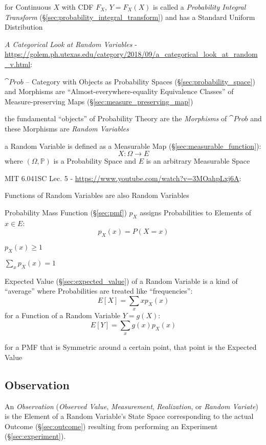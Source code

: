 for Continuous $X$ with CDF $F_X$, $Y = F_X(X)$ is called a \emph{Probability
  Integral Transform} (\S\ref{sec:probability_integral_transform}) and has a
Standard Uniform Distribution

\asterism

\emph{A Categorical Look at Random Variables} -
\url{https://golem.ph.utexas.edu/category/2018/09/a_categorical_look_at_random_v.html}:

$\cat{Prob}$ -- Category with Objects as Probability Spaces
(\S\ref{sec:probability_space}) and Morphisms are ``Almost-everywhere-equality
Equivalence Classes'' of Measure-preserving Maps
(\S\ref{sec:measure_preserving_map})

the fundamental ``objects'' of Probability Theory are the \emph{Morphisms} of
$\cat{Prob}$ and these Morphisms are \emph{Random Variables}

a Random Variable is defined as a Measurable Map
(\S\ref{sec:measurable_function}):
\[
  X : \Omega \to E
\]
where $(\Omega,\mathbb{P})$ is a Probability Space and $E$ is an arbitrary
Measurable Space

\asterism

MIT 6.041SC Lec. 5 - \url{https://www.youtube.com/watch?v=3MOahpLxj6A}:

Functions of Random Variables are also Random Variables

Probability Mass Function (\S\ref{sec:pmf}) $p_X$ assigns
Probabilities to Elements of $x \in E$:
\[
  p_X(x) = P(X = x)
\]

$p_X(x) \geq 1$

$\sum_x p_X(x) = 1$

Expected Value (\S\ref{sec:expected_value}) of a Random Variable is a kind of
``average'' where Probabilities are treated like ``frequencies'':
\[
  E[X] = \sum_x xp_X(x)
\]
for a Function of a Random Variable $Y = g(X)$:
\[
  E[Y] = \sum_x g(x)p_X(x)
\]

for a PMF that is Symmetric around a certain point, that point is the Expected
Value



\subsection{Observation}\label{sec:observation}

An \emph{Observation} (\emph{Observed Value}, \emph{Measurement},
\emph{Realization}, or \emph{Random Variate}) is the Element of a Random
Variable's State Space corresponding to the actual Outcome (\S\ref{sec:outcome})
resulting from performing an Experiment (\S\ref{sec:experiment}).

